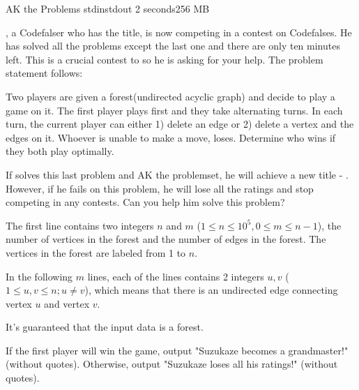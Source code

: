 
\begin{problem}{AK the Problems}
{stdin}{stdout}
{2 seconds}{256 MB}{}

\Suzukaze, a Codefalser who has the \master title, is now competing in a contest on Codefalses. He has solved all the problems except the last one and there are only ten minutes left. This is a crucial contest to \Suzukaze so he is asking for your help. The problem statement follows:

\par
Two players are given a forest(undirected acyclic graph) and decide to play a game on it. The first player plays first and they take alternating turns. In each turn, the current player can either 1) delete an edge or 2) delete a vertex and the edges on it. Whoever is unable to make a move, loses. Determine who wins if they both play optimally.

\par
If \Suzukaze  solves this last problem and AK the problemset, he will achieve a new title - \grandmaster. However, if he fails on this problem, he will lose all the ratings and stop competing in any contests. Can you help him solve this problem?

\InputFile

The first line contains two integers $n$ and $m$ ($1 \le n \le 10^5,0 \le m \le n-1 $), the number of vertices in the forest and the number of edges in the forest. The vertices in the forest are labeled from 1 to $n$.

In the following $m$ lines, each of the lines contains 2 integers $u, v$ ($1 \le u,v \le n; u \neq v$), which means that there is an undirected edge connecting vertex $u$ and vertex $v$.

It's guaranteed that the input data is a forest.

\OutputFile

If the first player will win the game, output "Suzukaze becomes a grandmaster!" (without quotes). Otherwise, output "Suzukaze loses all his ratings!" (without quotes).

\Examples

\begin{example}
%
\end{example}

\begin{example}
%
\end{example}

\end{problem}